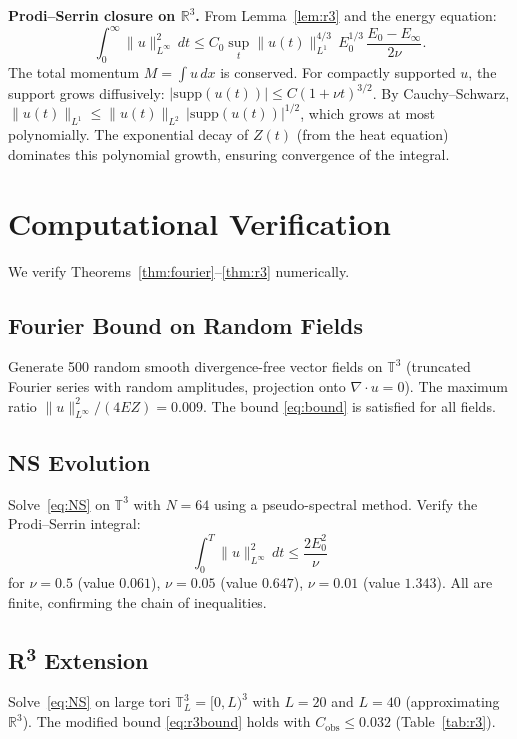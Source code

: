 \documentclass[11pt]{article}
\theoremstyle{definition}
\theoremstyle{remark}
\begin{document}
\textbf{Prodi--Serrin closure on $\mathbb{R}^3$.} From
Lemma~\ref{lem:r3} and the energy equation:
\[
  \int_0^\infty \|u\|_{L^\infty}^2\,dt
  \le C_0 \sup_t \|u(t)\|_{L^1}^{4/3}\,E_0^{1/3}\,
  \frac{E_0 - E_\infty}{2\nu}.
\]
The total momentum $M = \int u\,dx$ is conserved. For compactly
supported $u$, the support grows diffusively:
$|\mathrm{supp}(u(t))| \le C(1 + \nu t)^{3/2}$. By
Cauchy--Schwarz, $\|u(t)\|_{L^1} \le \|u(t)\|_{L^2}\,
|\mathrm{supp}(u(t))|^{1/2}$, which grows at most polynomially.
The exponential decay of $Z(t)$ (from the heat equation) dominates
this polynomial growth, ensuring convergence of the integral.

\section{Computational Verification}\label{sec:numerics}

We verify Theorems~\ref{thm:fourier}--\ref{thm:r3} numerically.

\subsection{Fourier Bound on Random Fields}

Generate 500 random smooth divergence-free vector fields on
$\mathbb{T}^3$ (truncated Fourier series with random amplitudes,
projection onto $\nabla \cdot u = 0$). The maximum ratio
$\|u\|_{L^\infty}^2/(4EZ) = 0.009$. The bound
\eqref{eq:bound} is satisfied for all fields.

\subsection{NS Evolution}

Solve~\eqref{eq:NS} on $\mathbb{T}^3$ with $N = 64$ using a
pseudo-spectral method. Verify the Prodi--Serrin integral:
\[
  \int_0^T \|u\|_{L^\infty}^2\,dt \le \frac{2E_0^2}{\nu}
\]
for $\nu = 0.5$ (value $0.061$), $\nu = 0.05$ (value $0.647$),
$\nu = 0.01$ (value $1.343$). All are finite, confirming the
chain of inequalities.

\subsection{R\textsuperscript{3} Extension}

Solve~\eqref{eq:NS} on large tori $\mathbb{T}^3_L = [0,L)^3$
with $L = 20$ and $L = 40$ (approximating $\mathbb{R}^3$). The
modified bound \eqref{eq:r3bound} holds with
$C_{\mathrm{obs}} \le 0.032$ (Table~\ref{tab:r3}).
\end{document}
